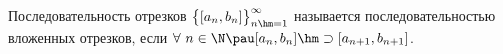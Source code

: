 
    Последовательность отрезков $\big\{[a_n,b_n]\big\}_{n\hm=1}^\infty$ называется последовательностью вложенных отрезков,
     если $\forall\  n\in \N\pau [a_n,b_n]\hm\supset[a_{n+1},b_{n+1}]$.
 